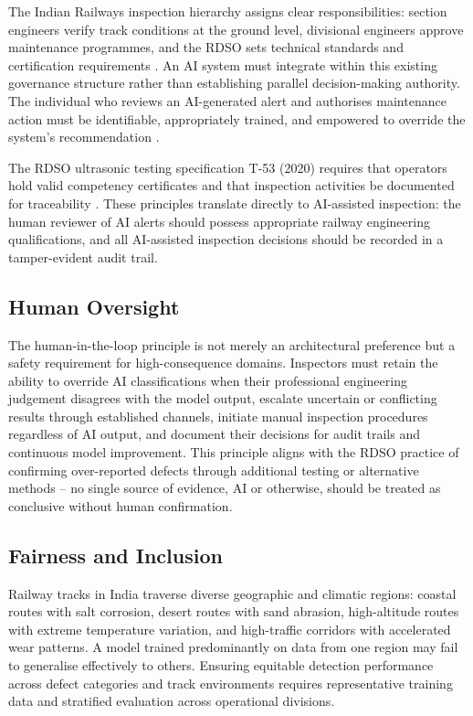 \documentclass[conference]{IEEE}
\begin{document}
The Indian Railways inspection hierarchy assigns clear responsibilities: section engineers verify track conditions at the ground level, divisional engineers approve maintenance programmes, and the RDSO sets technical standards and certification requirements \cite{rdso2020}. An AI system must integrate within this existing governance structure rather than establishing parallel decision-making authority. The individual who reviews an AI-generated alert and authorises maintenance action must be identifiable, appropriately trained, and empowered to override the system's recommendation \cite{pib2017}.

The RDSO ultrasonic testing specification T-53 (2020) requires that operators hold valid competency certificates and that inspection activities be documented for traceability \cite{rdso2020}. These principles translate directly to AI-assisted inspection: the human reviewer of AI alerts should possess appropriate railway engineering qualifications, and all AI-assisted inspection decisions should be recorded in a tamper-evident audit trail.

\subsection{Human Oversight}

The human-in-the-loop principle is not merely an architectural preference but a safety requirement for high-consequence domains. Inspectors must retain the ability to override AI classifications when their professional engineering judgement disagrees with the model output, escalate uncertain or conflicting results through established channels, initiate manual inspection procedures regardless of AI output, and document their decisions for audit trails and continuous model improvement. This principle aligns with the RDSO practice of confirming over-reported defects through additional testing or alternative methods \cite{rdso2020} -- no single source of evidence, AI or otherwise, should be treated as conclusive without human confirmation.

\subsection{Fairness and Inclusion}

Railway tracks in India traverse diverse geographic and climatic regions: coastal routes with salt corrosion, desert routes with sand abrasion, high-altitude routes with extreme temperature variation, and high-traffic corridors with accelerated wear patterns. A model trained predominantly on data from one region may fail to generalise effectively to others. Ensuring equitable detection performance across defect categories and track environments requires representative training data and stratified evaluation across operational divisions.
\end{document}
